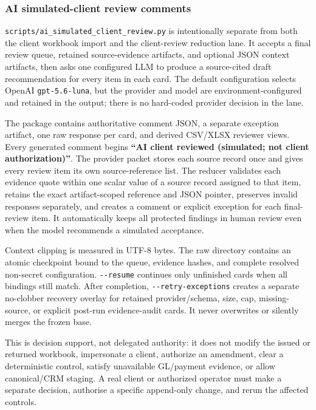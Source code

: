 \documentclass[
]{article}
\begin{document}
\subsubsection{AI simulated-client review
comments}\label{ai-simulated-client-review-comments}

\texttt{scripts/\allowbreak{}ai\_\allowbreak{}simulated\_\allowbreak{}client\_\allowbreak{}review.py}
is intentionally separate from both the client workbook import and the
client-review reduction lane. It accepts a final review queue, retained
source-evidence artifacts, and optional JSON context artifacts, then
asks one configured LLM to produce a source-cited draft recommendation
for every item in each card. The default configuration selects OpenAI
\texttt{gpt-5.6-luna}, but the provider and model are
environment-configured and retained in the output; there is no
hard-coded provider decision in the lane.

The package contains authoritative comment JSON, a separate exception
artifact, one raw response per card, and derived CSV/XLSX reviewer
views. Every generated comment begins \textbf{``AI client reviewed
(simulated; not client authorization)''}. The provider packet stores
each source record once and gives every review item its own
source-reference list. The reducer validates each evidence quote within
one scalar value of a source record assigned to that item, retains the
exact artifact-scoped reference and JSON pointer, preserves invalid
responses separately, and creates a comment or explicit exception for
each final-review item. It automatically keeps all protected findings in
human review even when the model recommends a simulated acceptance.

Context clipping is measured in UTF-8 bytes. The raw directory contains
an atomic checkpoint bound to the queue, evidence hashes, and complete
resolved non-secret configuration. \texttt{-\/-resume} continues only
unfinished cards when all bindings still match. After completion,
\texttt{-\/-retry-exceptions} creates a separate no-clobber recovery
overlay for retained provider/schema, size, cap, missing-source, or
explicit post-run evidence-audit cards. It never overwrites or silently
merges the frozen base.

This is decision support, not delegated authority: it does not modify
the issued or returned workbook, impersonate a client, authorize an
amendment, clear a deterministic control, satisfy unavailable GL/payment
evidence, or allow canonical/CRM staging. A real client or authorized
operator must make a separate decision, authorise a specific append-only
change, and rerun the affected controls.
\end{document}
